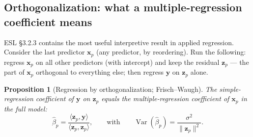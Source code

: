 \documentclass[11pt]{article}
\numberwithin{equation}{section}
\theoremstyle{plain}
\newtheorem{proposition}[theorem]{Proposition}
\theoremstyle{definition}
\theoremstyle{remark}
\DeclareMathOperator{\Var}{Var}
\newcommand{\x}{\bm{x}}
\newcommand{\y}{\bm{y}}
\begin{document}
\subsection{Orthogonalization: what a multiple-regression coefficient means}\label{sec:orthog}

ESL \S3.2.3 contains the most useful interpretive result in applied regression. Consider the last predictor $\x_p$ (any predictor, by reordering). Run the following: regress $\x_p$ on all other predictors (with intercept) and keep the residual $\bm{z}_p$ --- the part of $\x_p$ orthogonal to everything else; then regress $\y$ on $\bm{z}_p$ alone.

\begin{proposition}[Regression by orthogonalization; Frisch--Waugh]\label{prop:fwl}
The simple-regression coefficient of $\y$ on $\bm{z}_p$ equals the multiple-regression coefficient of $\x_p$ in the full model:
\begin{equation}
\hat\beta_p = \frac{\langle \bm{z}_p, \y \rangle}{\langle \bm{z}_p, \bm{z}_p \rangle},
\qquad\text{with}\qquad
\Var(\hat\beta_p) = \frac{\sigma^2}{\|\bm{z}_p\|^2}.
\label{eq:fwl}
\end{equation}
\end{proposition}
\end{document}

